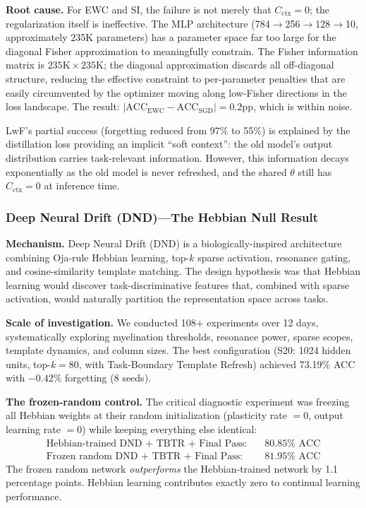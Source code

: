 \documentclass{article}
\begin{document}
\textbf{Root cause.} For EWC and SI, the failure is not merely that $C_\mathrm{ctx} = 0$; the regularization itself is ineffective. The MLP architecture (784$\to$256$\to$128$\to$10, approximately 235K parameters) has a parameter space far too large for the diagonal Fisher approximation to meaningfully constrain. The Fisher information matrix is $235\text{K} \times 235\text{K}$; the diagonal approximation discards all off-diagonal structure, reducing the effective constraint to per-parameter penalties that are easily circumvented by the optimizer moving along low-Fisher directions in the loss landscape. The result: $|\mathrm{ACC}_\mathrm{EWC} - \mathrm{ACC}_\mathrm{SGD}| = 0.2\text{pp}$, which is within noise.

LwF's partial success (forgetting reduced from 97\% to 55\%) is explained by the distillation loss providing an implicit ``soft context'': the old model's output distribution carries task-relevant information. However, this information decays exponentially as the old model is never refreshed, and the shared $\theta$ still has $C_\mathrm{ctx} = 0$ at inference time.

\subsubsection{Deep Neural Drift (DND)---The Hebbian Null Result}
\label{sec:dnd}

\textbf{Mechanism.} Deep Neural Drift (DND) is a biologically-inspired architecture combining Oja-rule Hebbian learning, top-$k$ sparse activation, resonance gating, and cosine-similarity template matching. The design hypothesis was that Hebbian learning would discover task-discriminative features that, combined with sparse activation, would naturally partition the representation space across tasks.

\textbf{Scale of investigation.} We conducted 108+ experiments over 12 days, systematically exploring myelination thresholds, resonance power, sparse scopes, template dynamics, and column sizes. The best configuration (S20: 1024 hidden units, top-$k = 80$, with Task-Boundary Template Refresh) achieved 73.19\% ACC with $-0.42\%$ forgetting (8 seeds).

\textbf{The frozen-random control.} The critical diagnostic experiment was freezing all Hebbian weights at their random initialization (plasticity rate $= 0$, output learning rate $= 0$) while keeping everything else identical:
\begin{align}
    \text{Hebbian-trained DND + TBTR + Final Pass:} &\quad 80.85\% \text{ ACC} \label{eq:dnd_hebbian} \\
    \text{Frozen random DND + TBTR + Final Pass:} &\quad 81.95\% \text{ ACC} \label{eq:dnd_frozen}
\end{align}
The frozen random network \emph{outperforms} the Hebbian-trained network by 1.1 percentage points. Hebbian learning contributes exactly zero to continual learning performance.
\end{document}
